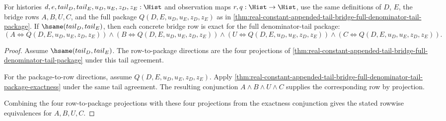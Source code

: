 \begin{theorem}
\label{thm:real-constant-appended-tail-bridge-single-row-full-denominator-tail-exactness}
For histories $d,e,tail_D,tail_E,u_D,u_E,z_D,z_E:\Hist$ and observation maps
$r,q:\Hist\to\Hist$, use the same definitions of $D$, $E$, the bridge rows
$A,B,U,C$, and the full package $Q(D,E,u_D,u_E,z_D,z_E)$ as in
\autoref{thm:real-constant-appended-tail-bridge-full-denominator-tail-package}.
If $\hsame(tail_D,tail_E)$, then each concrete bridge row is exact for the
full denominator-tail package:
$$
(A\Longleftrightarrow Q(D,E,u_D,u_E,z_D,z_E))\land
(B\Longleftrightarrow Q(D,E,u_D,u_E,z_D,z_E))\land
(U\Longleftrightarrow Q(D,E,u_D,u_E,z_D,z_E))\land
(C\Longleftrightarrow Q(D,E,u_D,u_E,z_D,z_E)).
$$
\end{theorem}
\begin{proof}
Assume $\hsame(tail_D,tail_E)$. The row-to-package directions are the four
projections of
\autoref{thm:real-constant-appended-tail-bridge-full-denominator-tail-package}
under this tail agreement.

For the package-to-row directions, assume
$Q(D,E,u_D,u_E,z_D,z_E)$. Apply
\autoref{thm:real-constant-appended-tail-bridge-full-denominator-tail-package-exactness}
under the same tail agreement. The resulting conjunction
$A\land B\land U\land C$ supplies the corresponding row by projection.

Combining the four row-to-package projections with these four projections from
the exactness conjunction gives the stated rowwise equivalences for
$A,B,U,C$.
\end{proof}

